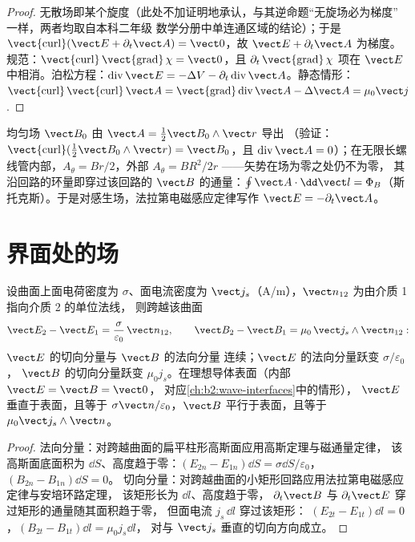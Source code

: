 \begin{proof}
无散场即某个旋度（此处不加证明地承认，与其逆命题“无旋场必为梯度”
一样，两者均取自本科二年级
数学分册中单连通区域的结论）；于是 $\operatorname{\vect{curl}}
(\vect E + \partial_t\vect A) = \vect 0$，故 $\vect E + \partial_t\vect A$ 为梯度。
规范：$\operatorname{\vect{curl}}\operatorname{\vect{grad}}\chi = \vect 0$，且
$\partial_t\operatorname{\vect{grad}}\chi$ 项在 $\vect E$ 中相消。泊松方程：$\operatorname{div}
\vect E = -\Delta V - \partial_t\operatorname{div}\vect A$。静态情形：$\operatorname{\vect{curl}}
\operatorname{\vect{curl}}\vect A = \operatorname{\vect{grad}}\operatorname{div}\vect A - \Delta\vect A
= \mu_0\vect j$.
\end{proof}

\begin{example}[两个矢势]\label{ex:b2:maxwell-equations:vectorpot}
均匀场 $\vect B_0$ 由 $\vect A = \tfrac12\vect B_0\wedge\vect r$ 导出
（验证：$\operatorname{\vect{curl}}(\tfrac12\vect B_0\wedge\vect r) = \vect B_0$，且
$\operatorname{div}\vect A = 0$）；在无限长螺线管内部，$A_\theta =
Br/2$，外部 $A_\theta = BR^2/2r$ ——矢势在场为零之处仍不为零，
其沿回路的环量即穿过该回路的
$\vect B$ 的通量：$\oint\vect A\cdot\dd\vect l = \Phi_B$（斯托克斯）。于是对感生场，法拉第电磁感应定律写作
$\vect E = -\partial_t\vect A$。
\end{example}

\section{界面处的场}

\begin{proposition}[边界关系]\label{prop:b2:maxwell-equations:boundary}
设曲面上面电荷密度为 $\sigma$、面电流密度为
$\vect j_s$（\unit{A/m}），$\vect n_{12}$ 为由介质 1 指向介质 2 的单位法线，
则跨越该曲面
\[
\vect E_2 - \vect E_1 = \frac\sigma{\varepsilon_0}\,\vect n_{12} , \qquad
\vect B_2 - \vect B_1 = \mu_0\,\vect j_s\wedge\vect n_{12} :
\]
$\vect E$ 的切向分量与 $\vect B$ 的法向分量
连续；$\vect E$ 的法向分量跃变 $\sigma/\varepsilon_0$，
$\vect B$ 的切向分量跃变 $\mu_0j_s$。在理想导体表面（内部 $\vect E = \vect B = \vect 0$，
对应\cref{ch:b2:wave-interfaces}中的情形），
$\vect E$ 垂直于表面，且等于 $\sigma\vect n/
\varepsilon_0$，$\vect B$ 平行于表面，且等于 $\mu_0\vect j_s\wedge\vect n$。
\end{proposition}

\begin{proof}
法向分量：对跨越曲面的扁平柱形高斯面应用高斯定理与磁通量定律，
该高斯面底面积为 $\dd S$、高度趋于零：$(E_{2n}
- E_{1n})\dd S = \sigma\dd S/\varepsilon_0$，$(B_{2n} - B_{1n})\dd S = 0$。
切向分量：对跨越曲面的小矩形回路应用法拉第电磁感应定律与安培环路定理，
该矩形长为 $\dd l$、高度趋于零，
$\partial_t\vect B$ 与 $\partial_t\vect E$ 穿过矩形的通量随其面积趋于零，
但面电流 $j_s\,\dd l$ 穿过该矩形：
$(E_{2t} - E_{1t})\dd l = 0$，$(B_{2t} - B_{1t})\dd l = \mu_0j_s\dd l$，
对与 $\vect j_s$ 垂直的切向方向成立。
\end{proof}

